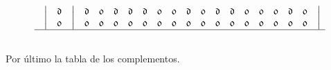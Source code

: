 \documentclass[final,12pt,a4paper,twoside,fleqn]{extbook}
\theoremstyle{definition}
\theoremstyle{remark}
\begin{document}
\begin{equation}
\begin{array}{@{}*{22}c@{}}
      {}             &%
      \big\vert      &%
      {\mathfrak{d}} &%
      \big\vert      &%
      {\mathfrak{d}} &%
      {\mathfrak{0}} &%
      {\mathfrak{d}} &%
      {\mathfrak{d}} &%
      {\mathfrak{d}} &%
      {\mathfrak{0}} &%
      {\mathfrak{0}} &%
      {\mathfrak{d}} &%
      {\mathfrak{0}} &%
      {\mathfrak{d}} &%
      {\mathfrak{d}} &%
      {\mathfrak{0}} &%
      {\mathfrak{0}} &%
      {\mathfrak{0}} &%
      {\mathfrak{d}} &%
      {\mathfrak{0}} &%
      \big\vert       %
      \\ \nonumber
      {}             &%
      \big\vert      &%
      {\mathfrak{0}} &%
      \big\vert      &%
      {\mathfrak{0}} &%
      {\mathfrak{0}} &%
      {\mathfrak{0}} &%
      {\mathfrak{0}} &%
      {\mathfrak{0}} &%
      {\mathfrak{0}} &%
      {\mathfrak{0}} &%
      {\mathfrak{0}} &%
      {\mathfrak{0}} &%
      {\mathfrak{0}} &%
      {\mathfrak{0}} &%
      {\mathfrak{0}} &%
      {\mathfrak{0}} &%
      {\mathfrak{0}} &%
      {\mathfrak{0}} &%
      {\mathfrak{0}} &%
      \big\vert       %
      \\ \hline \nonumber
    \end{array}
\end{equation}



	Por último la tabla de los complementos.
\end{document}
